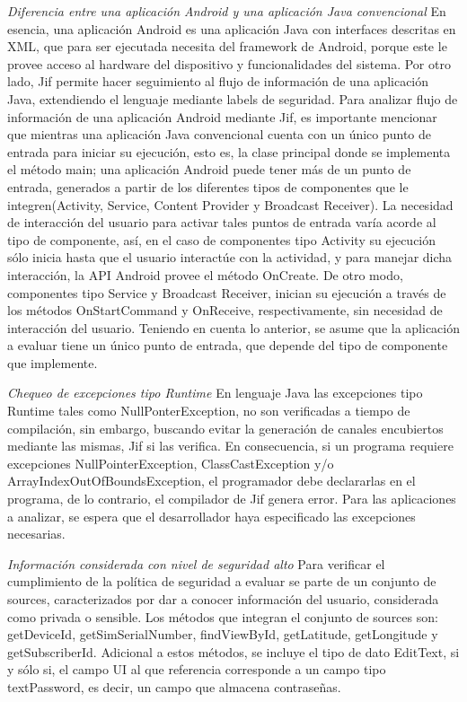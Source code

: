 \textit{Diferencia entre una aplicación Android y una aplicación Java
convencional}\newline 
En esencia, una aplicación Android es una aplicación Java con interfaces
descritas en XML, que para ser ejecutada necesita del framework de Android,
porque este le provee acceso al hardware del dispositivo y funcionalidades del
sistema.\newline 
Por otro lado, Jif permite hacer seguimiento al flujo de información de una
aplicación Java, extendiendo el lenguaje mediante labels de seguridad.\newline
Para analizar flujo de información de una aplicación Android mediante
Jif, es importante mencionar que mientras una aplicación Java convencional
cuenta con un único punto de entrada para iniciar su ejecución, esto es, la
clase principal donde se implementa el método main; una aplicación Android puede
tener más de un punto de entrada, generados a partir de los diferentes tipos de
componentes que le integren(Activity, Service, Content Provider y Broadcast
Receiver). La necesidad de interacción del usuario para activar tales puntos de
entrada varía acorde al tipo de componente, así, en el caso de componentes tipo
Activity su ejecución sólo inicia hasta que el usuario interactúe con la
actividad, y para manejar dicha interacción, la API Android provee el método
OnCreate. De otro modo, componentes tipo Service y Broadcast Receiver, inician
su ejecución a través de los métodos OnStartCommand y OnReceive,
respectivamente, sin necesidad de interacción del usuario.\newline 
{ \color{black} {Teniendo en cuenta lo anterior, se asume que la aplicación a
evaluar tiene un único punto de entrada, que depende del tipo de componente que
implemente.} }

\textit{Chequeo de excepciones tipo Runtime}\newline
En lenguaje Java las excepciones tipo Runtime tales como NullPonterException, no
son verificadas a tiempo de compilación, sin embargo, buscando evitar la
generación de canales encubiertos mediante las mismas, Jif si las verifica. 
En consecuencia, si un programa requiere excepciones NullPointerException,
ClassCastException y/o ArrayIndexOutOfBoundsException, el programador debe
declararlas en el programa, de lo contrario, el compilador de Jif genera error.
Para las aplicaciones a analizar, se espera que el desarrollador haya
especificado las excepciones necesarias.

\textit{Información considerada con nivel de seguridad alto}\newline
Para verificar el cumplimiento de la política de seguridad a evaluar se parte de
un conjunto de sources, caracterizados por dar a conocer información del usuario, 
considerada como privada o sensible. Los métodos que integran el conjunto de sources son: 
getDeviceId, getSimSerialNumber, findViewById, getLatitude, getLongitude y
getSubscriberId. Adicional a estos métodos, se incluye el tipo de dato EditText,
si y sólo si, el campo UI al que referencia corresponde a un campo tipo
textPassword, es decir, un campo que almacena contraseñas.

